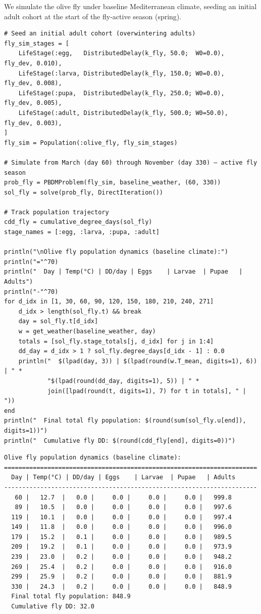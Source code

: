 \label{995895667434489247}{}


We simulate the olive fly under baseline Mediterranean climate, seeding an initial adult cohort at the start of the fly-active season (spring).




\begin{verbatim}
# Seed an initial adult cohort (overwintering adults)
fly_sim_stages = [
    LifeStage(:egg,   DistributedDelay(k_fly, 50.0;  W0=0.0),   fly_dev, 0.010),
    LifeStage(:larva, DistributedDelay(k_fly, 150.0; W0=0.0),   fly_dev, 0.008),
    LifeStage(:pupa,  DistributedDelay(k_fly, 250.0; W0=0.0),   fly_dev, 0.005),
    LifeStage(:adult, DistributedDelay(k_fly, 500.0; W0=50.0),  fly_dev, 0.003),
]
fly_sim = Population(:olive_fly, fly_sim_stages)

# Simulate from March (day 60) through November (day 330) — active fly season
prob_fly = PBDMProblem(fly_sim, baseline_weather, (60, 330))
sol_fly = solve(prob_fly, DirectIteration())

# Track population trajectory
cdd_fly = cumulative_degree_days(sol_fly)
stage_names = [:egg, :larva, :pupa, :adult]

println("\nOlive fly population dynamics (baseline climate):")
println("="^70)
println("  Day | Temp(°C) | DD/day | Eggs    | Larvae  | Pupae   | Adults")
println("-"^70)
for d_idx in [1, 30, 60, 90, 120, 150, 180, 210, 240, 271]
    d_idx > length(sol_fly.t) && break
    day = sol_fly.t[d_idx]
    w = get_weather(baseline_weather, day)
    totals = [sol_fly.stage_totals[j, d_idx] for j in 1:4]
    dd_day = d_idx > 1 ? sol_fly.degree_days[d_idx - 1] : 0.0
    println("  $(lpad(day, 3)) | $(lpad(round(w.T_mean, digits=1), 6))  | " *
            "$(lpad(round(dd_day, digits=1), 5)) | " *
            join([lpad(round(t, digits=1), 7) for t in totals], " | "))
end
println("  Final total fly population: $(round(sum(sol_fly.u[end]), digits=1))")
println("  Cumulative fly DD: $(round(cdd_fly[end], digits=0))")
\end{verbatim}




\begin{verbatim}
Olive fly population dynamics (baseline climate):
======================================================================
  Day | Temp(°C) | DD/day | Eggs    | Larvae  | Pupae   | Adults
----------------------------------------------------------------------
   60 |   12.7  |   0.0 |     0.0 |     0.0 |     0.0 |   999.8
   89 |   10.5  |   0.0 |     0.0 |     0.0 |     0.0 |   997.6
  119 |   10.1  |   0.0 |     0.0 |     0.0 |     0.0 |   997.4
  149 |   11.8  |   0.0 |     0.0 |     0.0 |     0.0 |   996.0
  179 |   15.2  |   0.1 |     0.0 |     0.0 |     0.0 |   989.5
  209 |   19.2  |   0.1 |     0.0 |     0.0 |     0.0 |   973.9
  239 |   23.0  |   0.2 |     0.0 |     0.0 |     0.0 |   948.2
  269 |   25.4  |   0.2 |     0.0 |     0.0 |     0.0 |   916.0
  299 |   25.9  |   0.2 |     0.0 |     0.0 |     0.0 |   881.9
  330 |   24.3  |   0.2 |     0.0 |     0.0 |     0.0 |   848.9
  Final total fly population: 848.9
  Cumulative fly DD: 32.0
\end{verbatim}



